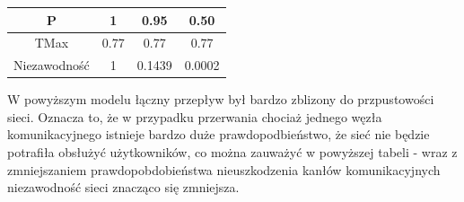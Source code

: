 \documentclass[titlepage]{article}
\begin{document}
\begin{table}[h!]
	\centering
    \label{tab:table5}
    \begin{tabular}{|c|c|c|c|}
    		\hline
      	P & 1 & 0.95 & 0.50\\
      	\hline
      	TMax & 0.77 & 0.77 & 0.77\\
      	\hline
      	Niezawodność & 1 & 0.1439 & 0.0002\\
		\hline
    \end{tabular}
\end{table}

W powyższym modelu łączny przepływ był bardzo zblizony do przpustowości sieci. Oznacza to, że w przypadku przerwania chociaż jednego węzła komunikacyjnego istnieje bardzo duże prawdopodbieństwo, że sieć nie będzie potrafiła obsłużyć użytkowników, co można zauważyć w powyższej tabeli - wraz z zmniejszaniem prawdopobdobieństwa nieuszkodzenia kanłów komunikacyjnych niezawodność sieci znacząco się zmniejsza.
\end{document}
